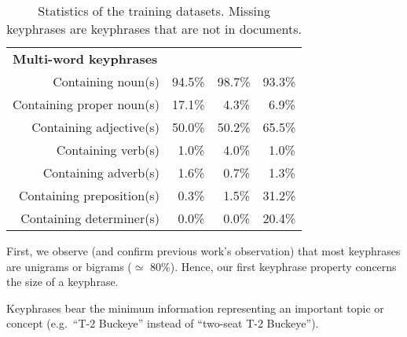 \begin{table}
\begin{tabular}{lr|ccc}
        \hline
        \multicolumn{2}{l|}{\textbf{Multi-word keyphrases}}\\
        \multicolumn{2}{r|}{Containing noun(s)} & 94.5\% & 98.7\% & 93.3\%\\
        \multicolumn{2}{r|}{Containing proper noun(s)} & 17.1\% & $~~$4.3\% & $~~$6.9\%\\
        \multicolumn{2}{r|}{Containing adjective(s)} & 50.0\% & 50.2\% & 65.5\%\\
        \multicolumn{2}{r|}{Containing verb(s)} & $~~$1.0\% & $~~$4.0\% & $~~$1.0\%\\
        \multicolumn{2}{r|}{Containing adverb(s)} & $~~$1.6\% & $~~$0.7\% & $~~$1.3\%\\
        \multicolumn{2}{r|}{Containing preposition(s)} & $~~$0.3\% & $~~$1.5\% & 31.2\%\\
        \multicolumn{2}{r|}{Containing determiner(s)} & $~~$0.0\% & $~~$0.0\% & 20.4\%\\
        \bottomrule
      \end{tabular}
      \caption{Statistics of the training datasets. Missing keyphrases are
               keyphrases that are not in documents.
               \label{tab:train_dataset_statistics}}
    \end{table}

    First, we observe (and confirm previous work's observation) that most
    keyphrases are unigrams or bigrams ($\simeq$ 80\%). Hence, our first
    keyphrase property concerns the size of a keyphrase.
    
    \begin{property}\label{prop:informativity}
      Keyphrases bear the minimum information representing an important topic or
      concept (e.g.~``T-2 Buckeye'' instead of ``two-seat T-2 Buckeye'').
    \end{property}

